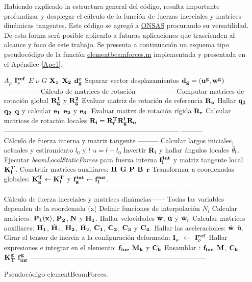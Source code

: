 Habiendo explicado la estructura general del código, resulta importante profundizar y desplegar el cálculo de la función de fuerzas inerciales y matrices dinámicas tangentes. Este código se agregó a \href{https://github.com/ONSAS/ONSAS.m/}{ONSAS} procurando su versatilidad. De esta forma será posible aplicarlo a futuras aplicaciones que trascienden al alcance y foco de este trabajo. Se presenta a continuación un esquema tipo pseudocódigo de la función \href{https://github.com/ONSAS/ONSAS/blob/master/src/elementBeamForces.m}{elementbeamforces.m} implementada y presentada en el Apéndice \ref{Ape1}. 


\begin{algorithm}
\begin{algorithmic} 
	\REQUIRE $A_{\rho}$ $\bf{I}_{\rho}^{ref}$ $E$ $\nu$ $G$ $\bf{X}_1$ $\bf{X}_2$ $\bf{d}_g^e$
	\STATE Separar vector desplazamientos $\bf{d}_g=(\bf{u}^g,\bf{w}^g)$
	\STATE ----------------$ \text{Cálculo de matrices de rotación } $---------------- 
	\STATE Computar matrices de rotación global $\bf{R}_g^1$ y $\bf{R}_g^2$
	\STATE Evaluar matriz de rotación de referencia $\bf{R}_o$
	\STATE Hallar $\bf{q}_1$ $\bf{q}_2$ $\bf{q}$ y calcular $\bf{e}_1$ $\bf{e}_2$ y $\bf{e}_3$.
	\STATE Evaluar maitrz de rotación rígida $\bf{R_r}$
	\STATE Calcular matrices de rotación locales $\bf{R}_i = \bf{R}_r^T \bf{R}_g^i \bf{R}_o$
	\STATE -----------------------------------------------------------------------------  
	\STATE --------- $\text{Cálculo de fuerza interna y matriz tangente } $---------
	\STATE Calcular largos iniciales, actuales y estiramiento $l_0$ y $l$ $u=l-l_0$
	\STATE Invertir $\bf{R}_i$ y hallar ángulos locales $\bf{\bar{\theta}_i}$.
	\STATE Ejecutar \emph{beamLocalStaticForces } para fuerza interna $\bf{f}_{l}^{int}$ y matriz tangente local $\bf{K}_{l}^{T}$.
	\STATE Construir matrices auxiliares: $\bf{H}$ $\bf{G}$ $\bf{P}$ $\bf{B}$  $\bf{r}$ 
	\STATE Transformar a coordenadas globales:  $\bf{K}^{T}_{g}\leftarrow\bf{K}^{T}_{l}$ y $\bf{f}_{g}^{int}\leftarrow\bf{f}^{int}_{l}$.
	\STATE -----------------------------------------------------------------------------  
	\STATE ------ $\text{Cálculo de fuerza inerciales y matrices dinámcias} $------
	\STATE Todas las variables dependen de la coordenada (x)
	\STATE Definir funciones de interpolación $N_i$
	\STATE Calcular matrices: $\bf{P_1}(x)$, $\bf{P_2}$, $\bf{N}$ y $\bf{H}_1$.
	\STATE Hallar velocidades  $\dot{\bf{w}}$, $\dot{\bf{u}}$ y $\dot{\bf{w}}_r$ 
	\STATE Calcular matrices auxiliares: $\bf{H}_1$, $\dot{\bf{H}}_1$, $\bf{H}_2$, $\dot{\bf{H}}_2$, $\bf{C}_1$, $\bf{C}_2$, $\bf{C}_3$ y $\bf{C}_4$.        
	\STATE Hallar las aceleraciones: $\ddot{\bf{w}}$  $\ddot{\bf{u}}$.
	\STATE Girar el tensor de inercia a la configuración deformada: $\bf{I}_{\rho}$ $\leftarrow$ $\bf{I}_{\rho}^{ref}$
	\STATE Hallar expresiones e integrar en el elemento: $\bf{f}_{ine}$ $\bf{M}_k$ y $\bf{C}_k$
	\STATE  Ensamblar : $\bf{f}_{ine}$ $\bf{M}$, $\bf{C}_k$ $\bf{K}_{T}^{g}$ $\bf{f}_{int}^{g}$
	\STATE -----------------------------------------------------------------------------  
	\ENDFOR 
\end{algorithmic}
\caption{Pseudocódigo elementBeamForces. }
\label{Pseudo:MET:elementBeamForces}
\end{algorithm}

